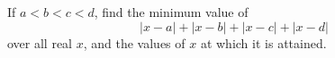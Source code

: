 If $a<b<c<d$, find the minimum value of
\[
|x-a|+|x-b|+|x-c|+|x-d|
\]
over all real $x$, and the values of $x$ at which it is attained.
